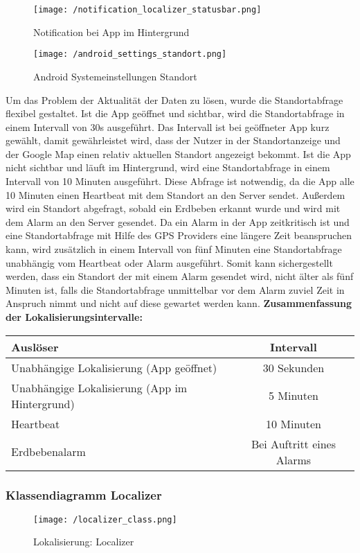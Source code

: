 \bigskip

\begin{figure}[H]
\hspace{15mm}
\begin{minipage}[hbt]{5cm}
	\centering
	\texttt{[image: /notification\_localizer\_statusbar.png]}
	\caption[Lokalisierung: deaktivierte Provider - Notification bei geschlossener App]{Notification bei App im Hintergrund}
	\label{Bild1}
\end{minipage}
\hfill
\begin{minipage}[hbt]{5cm}
	\centering
	\texttt{[image: /android\_settings\_standort.png]}
	\caption[Lokalisierung: Android Standorteinstellungen]{Android Systemeinstellungen Standort}
	\label{Bild2}
\end{minipage}
\hspace{15mm}
\end{figure}

\par\bigskip
Um das Problem der Aktualität der Daten zu lösen, wurde die Standortabfrage flexibel gestaltet. Ist die App geöffnet und sichtbar, wird die Standortabfrage in einem Intervall von 30s ausgeführt. Das Intervall ist bei geöffneter App kurz gewählt, damit gewährleistet wird, dass der Nutzer in der Standortanzeige und der Google Map einen relativ aktuellen Standort angezeigt bekommt. Ist die App nicht sichtbar und läuft im Hintergrund, wird eine Standortabfrage in einem Intervall von 10 Minuten ausgeführt. Diese Abfrage ist notwendig, da die App alle 10 Minuten einen Heartbeat mit dem Standort an den Server sendet. Außerdem wird ein Standort abgefragt, sobald ein Erdbeben erkannt wurde und wird mit dem Alarm an den Server gesendet. Da ein Alarm in der App zeitkritisch ist und eine Standortabfrage mit Hilfe des GPS Providers eine längere Zeit beanspruchen kann, wird zusätzlich in einem Intervall von fünf Minuten eine Standortabfrage unabhängig vom Heartbeat oder Alarm ausgeführt. Somit kann sichergestellt werden, dass ein Standort der mit einem Alarm gesendet wird, nicht älter als fünf Minuten ist, falls die Standortabfrage unmittelbar vor dem Alarm zuviel Zeit in Anspruch nimmt und nicht auf diese gewartet werden kann.
\newpage
\textbf{Zusammenfassung der Lokalisierungsintervalle:}
\\
\begin{center}
\begin{tabular}{ | l | c |}
	\hline
	\textbf{Auslöser} & \textbf{Intervall}\\    
	\hline
	Unabhängige Lokalisierung (App geöffnet) & 30 Sekunden\\    
    \hline
	Unabhängige Lokalisierung (App im Hintergrund) & 5 Minuten\\
	\hline	
	Heartbeat & 10 Minuten\\
	\hline	
	Erdbebenalarm & Bei Auftritt eines Alarms\\
	\hline
\end{tabular}
\end{center}
\bigskip
\subsubsection{Klassendiagramm Localizer}
\begin{figure}[H]
	\centering
	\texttt{[image: /localizer\_class.png]}
	\caption{Lokalisierung: Localizer}
	\label{fig:localizerClass}
\end{figure}